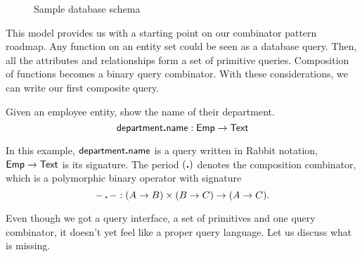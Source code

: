 \begin{figure}
    \label{fig:sample-schema}
    \centering
    \caption{Sample database schema}
\end{figure}

This model provides us with a starting point on our combinator pattern roadmap.
Any function on an entity set could be seen as a database query.  Then, all the
attributes and relationships form a set of primitive queries.  Composition of
functions becomes a binary query combinator.  With these considerations, we can
write our first composite query.

\begin{example}
    Given an employee entity, show the name of their department.
    \begin{equation*}
        \textup{\textsf{department}}\boldsymbol{.}\textup{\textsf{name}}: \textup{\textsf{Emp}} \to \textup{\textsf{Text}}
    \end{equation*}
\end{example}

In this example, $\textup{\textsf{department}}\boldsymbol{.}\textup{\textsf{name}}$ is a query written in Rabbit notation,
$\textup{\textsf{Emp}} \to \textup{\textsf{Text}}$ is its signature.  The period $(\boldsymbol{.})$ denotes the composition
combinator, which is a polymorphic binary operator with signature
\begin{equation*}
        -\,\boldsymbol{.}\,- : (A \to B) \times (B \to C) \to (A \to C).
\end{equation*}

Even though we got a query interface, a set of primitives and one query
combinator, it doesn't yet feel like a proper query language.  Let us discuss
what is missing.

